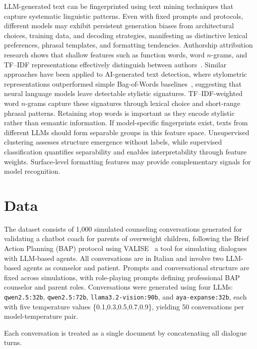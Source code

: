 \documentclass[11pt]{article}
\begin{document}
LLM-generated text can be fingerprinted using text mining techniques that capture systematic linguistic patterns. Even with fixed prompts and protocols, different models may exhibit persistent generation biases from architectural choices, training data, and decoding strategies, manifesting as distinctive lexical preferences, phrasal templates, and formatting tendencies.
Authorship attribution research shows that shallow features such as function words, word $n$-grams, and TF--IDF representations effectively distinguish between authors~\cite{unknown}. Similar approaches have been applied to AI-generated text detection, where stylometric representations outperformed simple Bag-of-Words baselines~\cite{kumarage2023stylometricdetectionaigeneratedtext}, suggesting that neural language models leave detectable stylistic signatures.
TF--IDF-weighted word $n$-grams capture these signatures through lexical choice and short-range phrasal patterns. Retaining stop words is important as they encode stylistic rather than semantic information. If model-specific fingerprints exist, texts from different LLMs should form separable groups in this feature space. Unsupervised clustering assesses structure emergence without labels, while supervised classification quantifies separability and enables interpretability through feature weights. Surface-level formatting features may provide complementary signals for model recognition.

\section{Data}

The dataset consists of 1,000 simulated counseling conversations generated for validating a chatbot coach for parents of overweight children, following the Brief Action Planning (BAP) protocol using VALISE~\cite{Bolpagni2025-xw} a tool for simulating dialogues with LLM-based agents. All conversations are in Italian and involve two LLM-based agents as counselor and patient. Prompts and conversational structure are fixed across simulations, with role-playing prompts defining professional BAP counselor and parent roles.
Conversations were generated using four LLMs: \texttt{qwen2.5:32b}, \texttt{qwen2.5:72b}, \texttt{llama3.2-vision:90b}, and \texttt{aya-expanse:32b}, each with five temperature values \{0.1,0.3,0.5,0.7,0.9\}, yielding 50 conversations per model-temperature pair.

Each conversation is treated as a single document by concatenating all dialogue turns.
\end{document}
